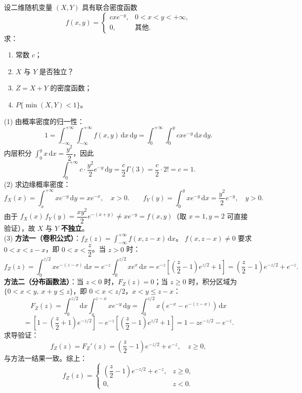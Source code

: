 \documentclass[lang=cn,11pt]{elegantbook}
\begin{document}
\begin{exercise} \label{exer:3-12e}
设二维随机变量 $(X,Y)$ 具有联合密度函数
\[
f(x,y) = \begin{cases} cxe^{-y}, & 0 < x < y < +\infty, \\ 0, & \text{其他}. \end{cases}
\]
求：
\begin{enumerate}
    \item[(1)] 常数 $c$；
    \item[(2)] $X$ 与 $Y$ 是否独立？
    \item[(3)] $Z = X + Y$ 的密度函数；
    \item[(4)] $P\{\min(X,Y) < 1\}$。
\end{enumerate}
\end{exercise}
\begin{solution}
(1) 由概率密度的归一性：
\[
1 = \int_{-\infty}^{+\infty}\int_{-\infty}^{+\infty}f(x,y)\,\mathrm{d}x\,\mathrm{d}y = \int_0^{+\infty}\int_0^y cxe^{-y}\,\mathrm{d}x\,\mathrm{d}y.
\]
内层积分 $\int_0^y x\,\mathrm{d}x = \dfrac{y^2}{2}$，因此
\[
\int_0^{+\infty}c \cdot \frac{y^2}{2}e^{-y}\,\mathrm{d}y = \frac{c}{2}\Gamma(3) = \frac{c}{2} \cdot 2! = c = 1.
\]
(2) 求边缘概率密度：
\[
f_X(x) = \int_x^{+\infty}xe^{-y}\,\mathrm{d}y = xe^{-x}, \quad x > 0. \qquad f_Y(y) = \int_0^y xe^{-y}\,\mathrm{d}x = \frac{y^2}{2}e^{-y}, \quad y > 0.
\]
由于 $f_X(x)\,f_Y(y) = \dfrac{xy^2}{2}e^{-(x+y)} \neq xe^{-y} = f(x,y)$（取 $x=1, y=2$ 可直接验证），故 $X$ 与 $Y$ \textbf{不独立}。\\
(3) \textbf{方法一（卷积公式）}：$f_Z(z) = \displaystyle\int_{-\infty}^{+\infty}f(x, z-x)\,\mathrm{d}x$。
$f(x, z-x) \neq 0$ 要求 $0 < x < z-x$，即 $0 < x < \dfrac{z}{2}$。当 $z > 0$ 时：
\[
f_Z(z) = \int_0^{z/2}xe^{-(z-x)}\,\mathrm{d}x = e^{-z}\int_0^{z/2}xe^x\,\mathrm{d}x = e^{-z}\left[\left(\frac{z}{2}-1\right)e^{z/2} + 1\right] = \left(\frac{z}{2}-1\right)e^{-z/2} + e^{-z}.
\]
\textbf{方法二（分布函数法）}：当 $z < 0$ 时，$F_Z(z) = 0$；当 $z \geqslant 0$ 时，积分区域为 $\{0 < x < y,\ x+y \leqslant z\}$，即 $0 < x < z/2$，$x < y \leqslant z-x$：
\[
F_Z(z) = \int_0^{z/2}\mathrm{d}x\int_x^{z-x}xe^{-y}\,\mathrm{d}y = \int_0^{z/2}x(e^{-x} - e^{-(z-x)})\,\mathrm{d}x
\]
\[
= \left[1 - \left(\frac{z}{2}+1\right)e^{-z/2}\right] - e^{-z}\left[\left(\frac{z}{2}-1\right)e^{z/2} + 1\right] = 1 - ze^{-z/2} - e^{-z}.
\]
求导验证：
\[
f_Z(z) = F_Z'(z) = \left(\frac{z}{2}-1\right)e^{-z/2} + e^{-z}, \quad z \geqslant 0,
\]
与方法一结果一致。综上：
\[
f_Z(z) = \begin{cases} \left(\dfrac{z}{2}-1\right)e^{-z/2} + e^{-z}, & z \geqslant 0, \\ 0, & z < 0. \end{cases}
\]
\end{solution}
\end{document}
